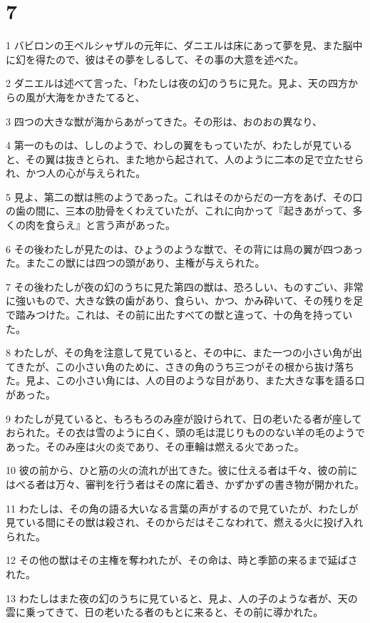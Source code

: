 \chapter{7}

\par 1 バビロンの王ベルシャザルの元年に、ダニエルは床にあって夢を見、また脳中に幻を得たので、彼はその夢をしるして、その事の大意を述べた。
\par 2 ダニエルは述べて言った、「わたしは夜の幻のうちに見た。見よ、天の四方からの風が大海をかきたてると、
\par 3 四つの大きな獣が海からあがってきた。その形は、おのおの異なり、
\par 4 第一のものは、ししのようで、わしの翼をもっていたが、わたしが見ていると、その翼は抜きとられ、また地から起されて、人のように二本の足で立たせられ、かつ人の心が与えられた。
\par 5 見よ、第二の獣は熊のようであった。これはそのからだの一方をあげ、その口の歯の間に、三本の肋骨をくわえていたが、これに向かって『起きあがって、多くの肉を食らえ』と言う声があった。
\par 6 その後わたしが見たのは、ひょうのような獣で、その背には鳥の翼が四つあった。またこの獣には四つの頭があり、主権が与えられた。
\par 7 その後わたしが夜の幻のうちに見た第四の獣は、恐ろしい、ものすごい、非常に強いもので、大きな鉄の歯があり、食らい、かつ、かみ砕いて、その残りを足で踏みつけた。これは、その前に出たすべての獣と違って、十の角を持っていた。
\par 8 わたしが、その角を注意して見ていると、その中に、また一つの小さい角が出てきたが、この小さい角のために、さきの角のうち三つがその根から抜け落ちた。見よ、この小さい角には、人の目のような目があり、また大きな事を語る口があった。
\par 9 わたしが見ていると、もろもろのみ座が設けられて、日の老いたる者が座しておられた。その衣は雪のように白く、頭の毛は混じりもののない羊の毛のようであった。そのみ座は火の炎であり、その車輪は燃える火であった。
\par 10 彼の前から、ひと筋の火の流れが出てきた。彼に仕える者は千々、彼の前にはべる者は万々、審判を行う者はその席に着き、かずかずの書き物が開かれた。
\par 11 わたしは、その角の語る大いなる言葉の声がするので見ていたが、わたしが見ている間にその獣は殺され、そのからだはそこなわれて、燃える火に投げ入れられた。
\par 12 その他の獣はその主権を奪われたが、その命は、時と季節の来るまで延ばされた。
\par 13 わたしはまた夜の幻のうちに見ていると、見よ、人の子のような者が、天の雲に乗ってきて、日の老いたる者のもとに来ると、その前に導かれた。
